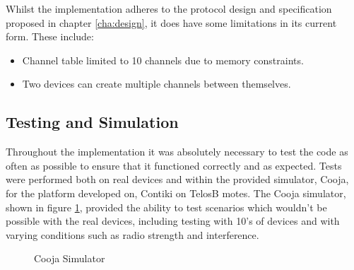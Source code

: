 Whilst the implementation adheres to the protocol design and specification proposed in chapter \ref{cha:design}, it does have some limitations in its current form. These include:
\begin{itemize}
 	\item Channel table limited to 10 channels due to memory constraints.
 	\item Two devices can create multiple channels between themselves. 
 \end{itemize} 



\subsection{Testing and Simulation} %
\label{sub:testing_and_simulation}
Throughout the implementation it was absolutely necessary to test the code as often as possible to ensure that it functioned correctly and as expected. Tests were performed both on real devices and within the provided simulator, Cooja, for the platform developed on, Contiki on TelosB motes. The Cooja simulator, shown in figure \ref{fig:simulator}, provided the ability to test scenarios which wouldn't be possible with the real devices, including testing with 10's of devices and with varying conditions such as radio strength and interference.

\begin{figure}[h!]
\centering
\caption{Cooja Simulator}
\label{fig:simulator}
\end{figure}


